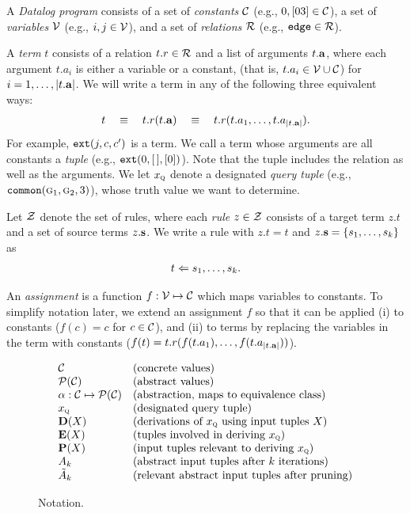 
A {\em Datalog program} consists of
a set of {\em constants} $\mathcal{C}$ (e.g., $0,[03] \in \mathcal{C}$),
a set of {\em variables} $\mathcal{V}$ (e.g., $i, j \in \mathcal{V}$), and
a set of {\em relations} $\mathcal{R}$ (e.g., $\text{\tt edge} \in \mathcal{R}$).

A {\em term} $t$ consists of a relation $t.r \in \mathcal{R}$ and a list of arguments $t.\mathbf{a}$,
where each argument $t.a_i$ is either a variable or a constant,
(that is, $t.a_i \in \mathcal{V} \cup \mathcal{C}$) for $i = 1, \dots, |t.\mathbf{a}|$.
We will write a term in any of the following three equivalent ways:
\begin{align}
t \quad\equiv\quad t.r(t.\mathbf{a}) \quad\equiv\quad t.r(t.a_1, \dots, t.a_{|t.\mathbf{a}|}).
\end{align}
For example, $\text{\tt ext}(j,c,c')$ is a term.
We call a term whose arguments are all constants a {\em tuple}
(e.g., $\text{\tt ext}(0, [\,], [0])$).
Note that the tuple includes the relation as well as the arguments.
We let $x_\text{\sc q}$ denote a designated {\em query tuple} (e.g., $\text{\tt common}(\text{\sc g}_1,\text{\sc g}_2,3)$),
whose truth value we want to determine.

Let $\mathcal{Z}$ denote the set of rules,
where each {\em rule} $z \in \mathcal{Z}$ consists of a target term $z.t$ and a set of source terms $z.\mathbf{s}$.
We write a rule with $z.t = t$ and $z.\mathbf{s} = \{ s_1, \dots, s_k \}$ as
\begin{align}
t \Leftarrow s_1, \dots, s_k.
\end{align}

An {\em assignment} is a function $f : \mathcal{V} \mapsto \mathcal{C}$ which maps variables to
constants.  To simplify notation later, we extend an assignment $f$ so that it
can be applied (i) to constants ($f(c) = c$ for $c \in \mathcal{C}$), and (ii) to terms by
replacing the variables in the term with constants ($f(t) = t.r(f(t.a_1), \dots, f(t.a_{|t.\mathbf{a}|}))$).

\begin{figure}[t]
\[
\begin{array}{ll}
\mathcal{C}                           & \text{(concrete values)} \\
\mathcal{P}(\mathcal{C})                      & \text{(abstract values)} \\
\alpha : \mathcal{C} \mapsto \mathcal{P}(\mathcal{C}) & \text{(abstraction, maps to equivalence class)} \\
x_\text{\sc q}                           & \text{(designated query tuple)} \\
\mathbf{D}(X)                        & \text{(derivations of $x_\text{\sc q}$ using input tuples $X$)} \\
\mathbf{E}(X)                        & \text{(tuples involved in deriving $x_\text{\sc q}$)} \\
\mathbf{P}(X)                        & \text{(input tuples relevant to deriving $x_\text{\sc q}$)} \\
A_k                           & \text{(abstract input tuples after $k$ iterations)} \\
\tilde A_k                    & \text{(relevant abstract input tuples after pruning)} \\
\end{array}
\]
\caption{\label{fig:notation} Notation.}
\end{figure}

